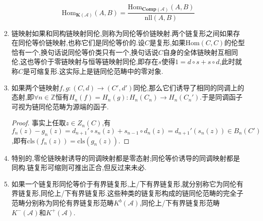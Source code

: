\begin{enumerate}
    $$\mathrm{Hom}_{\textbf{K}(\mathscr{A})}(A,B)=\frac{\mathrm{Hom}_{\textbf{Comp}(\mathscr{A})}(A,B)}{\mathrm{nll}(A,B)}$$
    \item 链映射如果和同构链映射同伦,则称为同伦等价链映射.两个链复形之间如果存在同伦等价链映射,也称它们是同伦等价的.设$C$是复形,如果$\mathrm{Hom}(C,C)$的伦型恰有一个,换句话说同伦等价类只有一个,换句话说$C$自身的全体链映射互相同伦,这也等价于零链映射与恒等链映射同伦,即存在$s$使得$1=d\circ s+s\circ d$,此时就称$C$是可缩复形.这实际上是链同伦范畴中的零对象.
    \item 如果两个链映射$f,g:(C,d)\to(C',d')$同伦,那么它们诱导了相同的同调上的态射,即$\forall n\in\mathbb{Z}$恒有$H_n(f)=H_n(g):H_n(C_n)\to H_n(C_n')$.于是同调函子可视为链同伦范畴为源端的函子.
    \begin{proof}
    	
    	事实上任取$z\in Z_n(C)$,有$f_n(z)-g_n(z)=d_{n+1}'\circ s_n(z)+s_{n-1}\circ d_n(z)=d_{n+1}'(s_n(z))\in B_n(C')$,即有$\mathrm{cls}(f_n(z))=\mathrm{cls}(g_n(z))$.
    \end{proof}
    \item 特别的,零伦链映射诱导的同调映射都是零态射;同伦等价诱导的同调映射都是同构.链复形可缩则可推出正合,但反过来未必.
    \item 如果一个链复形同伦等价于有界链复形,上/下有界链复形,就分别称它为同伦有界链复形,同伦上/下有界链复形.这些种类的链复形构成的链同伦范畴的完全子范畴分别称为同伦有界链复形范畴$K^b(\mathscr{A})$,同伦上/下有界链复形范畴$K^-(\mathscr{A})$和$K^+(\mathscr{A})$.
\end{enumerate}

